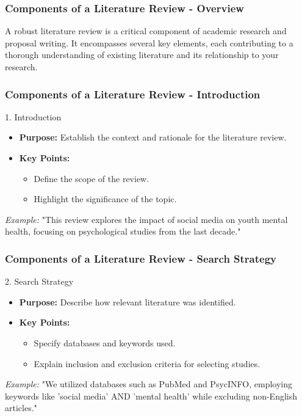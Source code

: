 \documentclass[aspectratio=169]{beamer}
\begin{document}
\begin{frame}[fragile]
    \frametitle{Components of a Literature Review - Overview}
    A robust literature review is a critical component of academic research and proposal writing. It encompasses several key elements, each contributing to a thorough understanding of existing literature and its relationship to your research.
\end{frame}

\begin{frame}[fragile]
    \frametitle{Components of a Literature Review - Introduction}
    \begin{block}{1. Introduction}
        \begin{itemize}
            \item \textbf{Purpose:} Establish the context and rationale for the literature review.
            \item \textbf{Key Points:}
                \begin{itemize}
                    \item Define the scope of the review.
                    \item Highlight the significance of the topic.
                \end{itemize}
        \end{itemize}
        \textit{Example:} "This review explores the impact of social media on youth mental health, focusing on psychological studies from the last decade."
    \end{block}
\end{frame}

\begin{frame}[fragile]
    \frametitle{Components of a Literature Review - Search Strategy}
    \begin{block}{2. Search Strategy}
        \begin{itemize}
            \item \textbf{Purpose:} Describe how relevant literature was identified.
            \item \textbf{Key Points:}
                \begin{itemize}
                    \item Specify databases and keywords used.
                    \item Explain inclusion and exclusion criteria for selecting studies.
                \end{itemize}
        \end{itemize}
        \textit{Example:} "We utilized databases such as PubMed and PsycINFO, employing keywords like 'social media' AND 'mental health' while excluding non-English articles."
    \end{block}
\end{frame}
\end{document}
